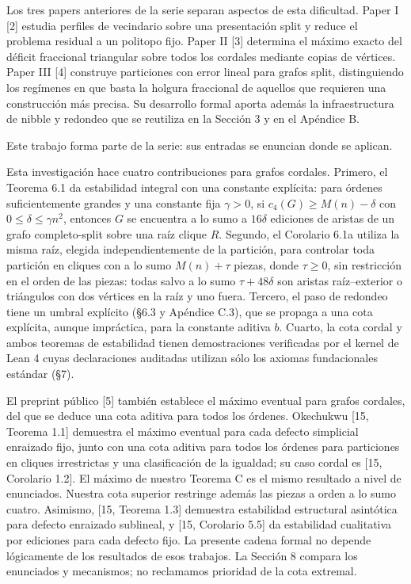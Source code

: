 \documentclass[spanish,11pt,a4paper]{article}
\begin{document}
Los tres papers anteriores de la serie separan aspectos de esta dificultad. Paper I {[}2{]} estudia perfiles de vecindario sobre una presentación split y reduce el problema residual a un politopo fijo. Paper II {[}3{]} determina el máximo exacto del déficit fraccional triangular sobre todos los cordales mediante copias de vértices. Paper III {[}4{]} construye particiones con error lineal para grafos split, distinguiendo los regímenes en que basta la holgura fraccional de aquellos que requieren una construcción más precisa. Su desarrollo formal aporta además la infraestructura de nibble y redondeo que se reutiliza en la Sección 3 y en el Apéndice B.

Este trabajo forma parte de la serie: sus entradas se enuncian donde se aplican.

Esta investigación hace cuatro contribuciones para grafos cordales. Primero, el Teorema 6.1 da estabilidad integral con una constante explícita: para órdenes suficientemente grandes y una constante fija \(\gamma>0\), si \(c_4(G)\ge M(n)-\delta\) con \(0\le\delta\le\gamma n^2\), entonces \(G\) se encuentra a lo sumo a \(16\delta\) ediciones de aristas de un grafo completo-split sobre una raíz clique \(R\). Segundo, el Corolario 6.1a utiliza la misma raíz, elegida independientemente de la partición, para controlar toda partición en cliques con a lo sumo \(M(n)+\tau\) piezas, donde \(\tau\ge0\), sin restricción en el orden de las piezas: todas salvo a lo sumo \(\tau+48\delta\) son aristas raíz--exterior o triángulos con dos vértices en la raíz y uno fuera. Tercero, el paso de redondeo tiene un umbral explícito (§6.3 y Apéndice C.3), que se propaga a una cota explícita, aunque impráctica, para la constante aditiva \(b\). Cuarto, la cota cordal y ambos teoremas de estabilidad tienen demostraciones verificadas por el kernel de Lean 4 cuyas declaraciones auditadas utilizan sólo los axiomas fundacionales estándar (§7).

El preprint público {[}5{]} también establece el máximo eventual para grafos cordales, del que se deduce una cota aditiva para todos los órdenes. Okechukwu {[}15, Teorema 1.1{]} demuestra el máximo eventual para cada defecto simplicial enraizado fijo, junto con una cota aditiva para todos los órdenes para particiones en cliques irrestrictas y una clasificación de la igualdad; su caso cordal es {[}15, Corolario 1.2{]}. El máximo de nuestro Teorema C es el mismo resultado a nivel de enunciados. Nuestra cota superior restringe además las piezas a orden a lo sumo cuatro. Asimismo, {[}15, Teorema 1.3{]} demuestra estabilidad estructural asintótica para defecto enraizado sublineal, y {[}15, Corolario 5.5{]} da estabilidad cualitativa por ediciones para cada defecto fijo. La presente cadena formal no depende lógicamente de los resultados de esos trabajos. La Sección 8 compara los enunciados y mecanismos; no reclamamos prioridad de la cota extremal.
\end{document}
